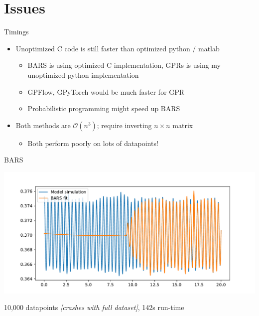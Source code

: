 \documentclass[presentation]{beamer}
\begin{document}
\section{Issues}
\label{sec:orgc897808}
\begin{frame}[label={sec:orgc3f11b1}]{Timings}
\begin{itemize}
\item Unoptimized C code is still faster than optimized python / matlab
\begin{itemize}
\item BARS is using optimized C implementation, GPRs is using my unoptimized python implementation
\item GPFlow, GPyTorch would be much faster for GPR
\item Probabilistic programming might speed up BARS
\end{itemize}
\end{itemize}
\vfill
\begin{itemize}
\item Both methods are \(\mathcal{O}(n^3)\); require inverting \(n \times n\) matrix
\begin{itemize}
\item Both perform poorly on lots of datapoints!
\end{itemize}
\end{itemize}
\end{frame}

\begin{frame}[label={sec:orgcbec05c}]{BARS}
\begin{center}
\includegraphics[width=.9\linewidth]{./barsfull1.pdf}
\end{center}

10,000 datapoints \emph{[crashes with full dataset]}, 142s run-time
\end{frame}
\end{document}
